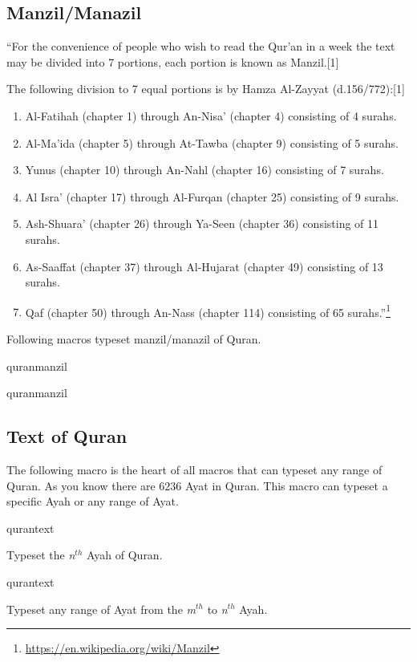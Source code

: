 \documentclass{ltxdoc}
\begin{document}
\subsection{Manzil/Manazil}
``For the convenience of people who wish to read the Qur'an in a week the text may be divided into 7 portions, each portion is known as Manzil.[1]

The following division to 7 equal portions is by Hamza Al-Zayyat (d.156/772):[1]
\begin{enumerate}
    \item Al-Fatihah (chapter 1) through An-Nisa' (chapter 4) consisting of 4 surahs.
    \item Al-Ma'ida (chapter 5) through At-Tawba (chapter 9) consisting of 5 surahs.
    \item Yunus (chapter 10) through An-Nahl (chapter 16) consisting of 7 surahs.
    \item Al Isra' (chapter 17) through Al-Furqan (chapter 25) consisting of 9 surahs.
    \item Ash-Shuara' (chapter 26) through Ya-Seen (chapter 36) consisting of 11 surahs.
    \item As-Saaffat (chapter 37) through Al-Hujarat (chapter 49) consisting of 13 surahs.
    \item Qaf (chapter 50) through An-Nass (chapter 114) consisting of 65 surahs.''\footnote{\url{https://en.wikipedia.org/wiki/Manzil}}
\end{enumerate}

Following macros typeset manzil/manazil of Quran.

\begin{declcs}{quranmanzil}
\end{declcs}
\begin{declcs}{quranmanzil}
\end{declcs}

\subsection{Text of Quran}
The following macro is the heart of all macros that can typeset any range of Quran. As you know there 
are $6236$ Ayat in Quran. This macro can typeset a specific Ayah or any range of Ayat. 

\begin{declcs}{qurantext}
\end{declcs}
Typeset the \textit{n}$^{th}$ Ayah of Quran. 

\begin{declcs}{qurantext}
\end{declcs}
Typeset any range of Ayat from the \textit{m}$^{th}$ to \textit{n}$^{th}$ Ayah. 
 
\end{document}
